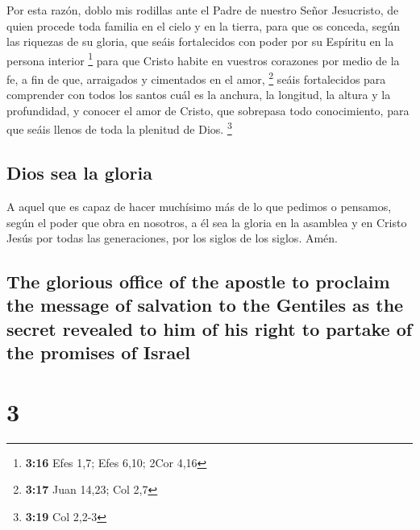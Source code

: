 \begin{paracol}{2}
 Por esta razón, doblo mis rodillas ante el Padre de
nuestro Señor Jesucristo,  de quien procede toda familia
en el cielo y en la tierra,  para que os conceda, según
las riquezas de su gloria, que seáis fortalecidos con poder por su
Espíritu en la persona interior \footnote{\textbf{3:16} Efes 1,7; Efes
  6,10; 2Cor 4,16}  para que Cristo habite en vuestros
corazones por medio de la fe, a fin de que, arraigados y cimentados en
el amor, \footnote{\textbf{3:17} Juan 14,23; Col 2,7} 
seáis fortalecidos para comprender con todos los santos cuál es la
anchura, la longitud, la altura y la profundidad,  y
conocer el amor de Cristo, que sobrepasa todo conocimiento, para que
seáis llenos de toda la plenitud de Dios. \footnote{\textbf{3:19} Col
  2,2-3}

\hypertarget{dios-sea-la-gloria}{%
\subsection{Dios sea la gloria}\label{dios-sea-la-gloria}}

 A aquel que es capaz de hacer muchísimo más de lo que
pedimos o pensamos, según el poder que obra en nosotros, 
a él sea la gloria en la asamblea y en Cristo Jesús por todas las
generaciones, por los siglos de los siglos. Amén.

\switchcolumn
\begin{otherlanguage}{english}

\hypertarget{the-glorious-office-of-the-apostle-to-proclaim-the-message-of-salvation-to-the-gentiles-as-the-secret-revealed-to-him-of-his-right-to-partake-of-the-promises-of-israel}{%
\subsection{The glorious office of the apostle to proclaim the message
of salvation to the Gentiles as the secret revealed to him of his right
to partake of the promises of
Israel}\label{the-glorious-office-of-the-apostle-to-proclaim-the-message-of-salvation-to-the-gentiles-as-the-secret-revealed-to-him-of-his-right-to-partake-of-the-promises-of-israel}}

\hypertarget{section-5}{%
\section{3}\label{section-5}}


\end{otherlanguage}
\end{paracol}
